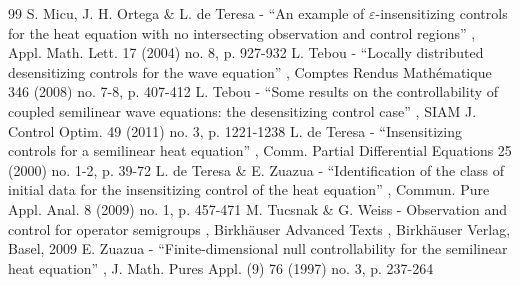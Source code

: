 \begin{thebibliography}{99}
 S. Micu, J. H. Ortega \& L. de Teresa - “An example of $\varepsilon $-insensitizing controls for the heat equation with no intersecting observation and control regions” , Appl. Math. Lett. 17 (2004) no. 8, p. 927-932
 L. Tebou - “Locally distributed desensitizing controls for the wave equation” , Comptes Rendus Mathématique 346 (2008) no. 7-8, p. 407-412
 L. Tebou - “Some results on the controllability of coupled semilinear wave equations: the desensitizing control case” , SIAM J. Control Optim. 49 (2011) no. 3, p. 1221-1238
 L. de Teresa - “Insensitizing controls for a semilinear heat equation” , Comm. Partial Differential Equations 25 (2000) no. 1-2, p. 39-72
 L. de Teresa \& E. Zuazua - “Identification of the class of initial data for the insensitizing control of the heat equation” , Commun. Pure Appl. Anal. 8 (2009) no. 1, p. 457-471
 M. Tucsnak \& G. Weiss - Observation and control for operator semigroups , Birkhäuser Advanced Texts , Birkhäuser Verlag, Basel, 2009
 E. Zuazua - “Finite-dimensional null controllability for the semilinear heat equation” , J. Math. Pures Appl. (9) 76 (1997) no. 3, p. 237-264
\end{thebibliography}
